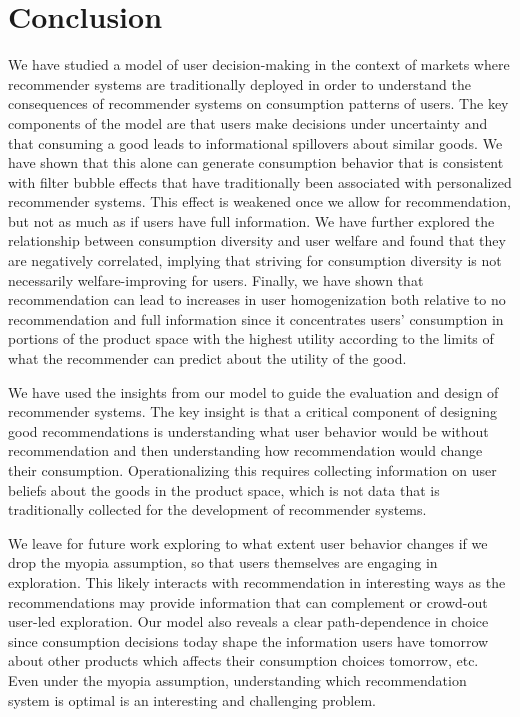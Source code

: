 \documentclass[sigconf]{acmart}
\begin{document}
\section{Conclusion}
We have studied a model of user decision-making in the context of markets where recommender systems are traditionally deployed in order to understand the consequences of recommender systems on consumption patterns of users. The key components of the model are that users make decisions under uncertainty and that consuming a good leads to informational spillovers about similar goods. We have shown that this alone can generate consumption behavior that is consistent with filter bubble effects that have traditionally been associated with personalized recommender systems. This effect is weakened once we allow for recommendation, but not as much as if users have full information. We have further explored the relationship between consumption diversity and user welfare and found that they are negatively correlated, implying that striving for consumption diversity is not necessarily welfare-improving for users. Finally, we have shown that recommendation can lead to increases in user homogenization both relative to no recommendation and full information since it concentrates users' consumption in portions of the product space with the highest utility according to the limits of what the recommender can predict about the utility of the good.
\par

We have used the insights from our model to guide the evaluation and design of recommender systems. The key insight is that a critical component of designing good recommendations is understanding what user behavior would be without recommendation and then understanding how recommendation would change their consumption. Operationalizing this requires collecting information on user beliefs about the goods in the product space, which is not data that is traditionally collected for the development of recommender systems.
\par

We leave for future work exploring to what extent user behavior changes if we drop the myopia assumption, so that users themselves are engaging in exploration. This likely interacts with recommendation in interesting ways as the recommendations may provide information that can complement or crowd-out user-led exploration. Our model also reveals a clear path-dependence in choice since consumption decisions today shape the information users have tomorrow about other products which affects their consumption choices tomorrow, etc. Even under the myopia assumption, understanding which recommendation system is optimal is an interesting and challenging problem.
\par




\end{document}
